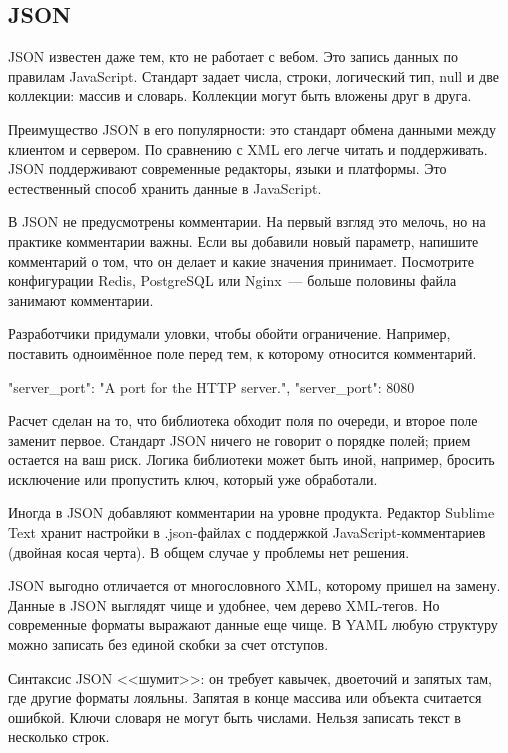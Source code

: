 \subsection{JSON}

JSON известен даже тем, кто не работает с вебом. Это запись данных по правилам
JavaScript. Стандарт задает числа, строки, логический тип, null и две коллекции:
массив и словарь. Коллекции могут быть вложены друг в друга.

Преимущество JSON в его популярности: это стандарт обмена данными между
клиентом и сервером. По сравнению с XML его легче читать и поддерживать. JSON
поддерживают современные редакторы, языки и платформы. Это естественный способ
хранить данные в JavaScript.

В JSON не предусмотрены комментарии. На первый взгляд это мелочь, но на практике
комментарии важны. Если вы добавили новый параметр, напишите комментарий о том,
что он делает и какие значения принимает. Посмотрите конфигурации Redis,
PostgreSQL или Nginx~--- больше половины файла занимают комментарии.

Разработчики придумали уловки, чтобы обойти ограничение. Например, поставить
одноим\"{е}нное поле перед тем, к которому относится комментарий.

\begin{english}
  \begin{json}
{
    "server_port": "A port for the HTTP server.",
    "server_port": 8080
}
  \end{json}
\end{english}

Расчет сделан на то, что библиотека обходит поля по очереди, и второе поле
заменит первое. Стандарт JSON ничего не говорит о порядке полей; прием остается
на ваш риск. Логика библиотеки может быть иной, например, бросить исключение или
пропустить ключ, который уже обработали.

Иногда в JSON добавляют комментарии на уровне продукта. Редактор Sublime Text
хранит настройки в .json-файлах с поддержкой JavaScript-комментариев (двойная
косая черта). В общем случае у проблемы нет решения.

JSON выгодно отличается от многословного XML, которому пришел на замену. Данные
в JSON выглядят чище и удобнее, чем дерево XML-тегов. Но современные форматы
выражают данные еще чище. В YAML любую структуру можно записать без единой
скобки за счет отступов.

Синтаксис JSON <<шумит>>: он требует кавычек, двоеточий и запятых там, где
другие форматы лояльны. Запятая в конце массива или объекта считается
ошибкой. Ключи словаря не могут быть числами. Нельзя записать текст в несколько
строк.

